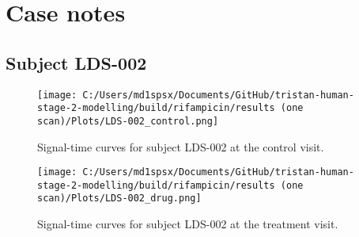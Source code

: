 \documentclass{epflreport}%
\begin{document}
\section{Case notes}%
\label{sec:Casenotes}%

%
\subsection{Subject LDS{-}002}%
\label{subsec:SubjectLDS{-}002}%

%


\begin{figure}[h!]%
\centering%
\texttt{[image: C:/Users/md1spsx/Documents/GitHub/tristan-human-stage-2-modelling/build/rifampicin/results (one scan)/Plots/LDS-002\_control.png]}%
\caption{Signal{-}time curves for subject LDS{-}002 at the control visit.}%
\end{figure}

%


\begin{figure}[h!]%
\centering%
\texttt{[image: C:/Users/md1spsx/Documents/GitHub/tristan-human-stage-2-modelling/build/rifampicin/results (one scan)/Plots/LDS-002\_drug.png]}%
\caption{Signal{-}time curves for subject LDS{-}002 at the treatment visit.}%
\end{figure}
\end{document}
